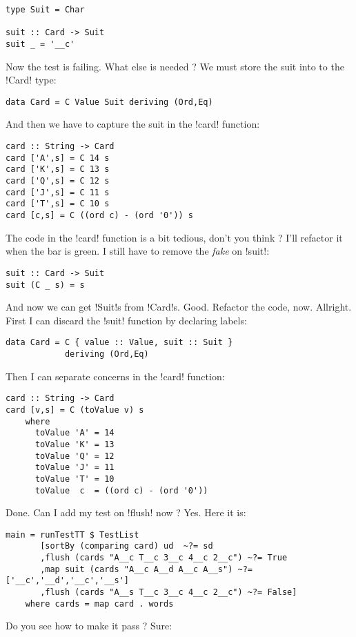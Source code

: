 \begin{lstlisting}[frame=single]
type Suit = Char

suit :: Card -> Suit
suit _ = '__c'
\end{lstlisting}
\failure Now the test is failing.
\lhN What else is needed ?
\lhA \failure We must store the suit into to the \il!Card! type:
\begin{lstlisting}[frame=single]
data Card = C Value Suit deriving (Ord,Eq)
\end{lstlisting}
And then we have to capture the suit in the \il!card! function:
\begin{lstlisting}[frame=single]
card :: String -> Card
card ['A',s] = C 14 s
card ['K',s] = C 13 s
card ['Q',s] = C 12 s
card ['J',s] = C 11 s
card ['T',s] = C 10 s
card [c,s] = C ((ord c) - (ord '0')) s
\end{lstlisting}
\lhN \failure The code in the \il!card! function is a bit tedious, don't you think ?
\lhA \failure I'll refactor it when the bar is green. I still have to remove the \emph{fake} on \il!suit!:
\begin{lstlisting}[frame=single]
suit :: Card -> Suit
suit (C _ s) = s
\end{lstlisting}
\success And now we can get \il!Suit!s from \il!Card!s.
\lhN Good. Refactor the code, now.
\lhA \success Allright. First I can discard the \il!suit! function by declaring labels:
\begin{lstlisting}[frame=single]
data Card = C { value :: Value, suit :: Suit } 
            deriving (Ord,Eq)
\end{lstlisting}
Then I can separate concerns in the \il!card! function:
\begin{lstlisting}[frame=single]
card :: String -> Card
card [v,s] = C (toValue v) s
    where 
      toValue 'A' = 14
      toValue 'K' = 13
      toValue 'Q' = 12
      toValue 'J' = 11
      toValue 'T' = 10
      toValue  c  = ((ord c) - (ord '0'))
\end{lstlisting}
\success Done.
\lhN Can I add my test on \il!flush! now ?
\lhA Yes.
\lhN Here it is:
\begin{lstlisting}[frame=single]
main = runTestTT $ TestList 
       [sortBy (comparing card) ud  ~?= sd
       ,flush (cards "A__c T__c 3__c 4__c 2__c") ~?= True
       ,map suit (cards "A__c A__d A__c A__s") ~?= ['__c','__d','__c','__s']
       ,flush (cards "A__s T__c 3__c 4__c 2__c") ~?= False]
    where cards = map card . words
\end{lstlisting} %
Do you see how to make it pass ?
\lhA \failure Sure: 
